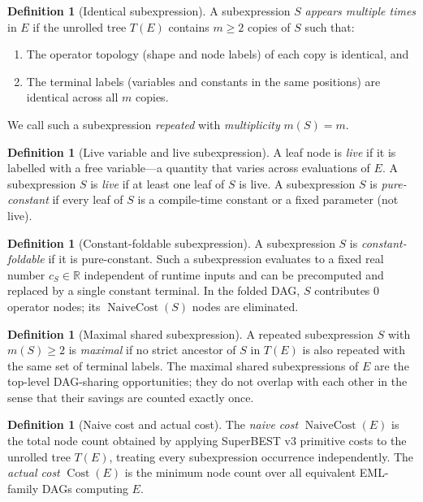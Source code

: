 \documentclass[12pt,a4paper]{article}
\theoremstyle{definition}
\newtheorem{definition}[theorem]{Definition}
\newcommand{\Cost}{\operatorname{Cost}}
\newcommand{\NC}{\operatorname{NaiveCost}}
\begin{document}
\begin{definition}[Identical subexpression]
\label{def:identical}
A subexpression $S$ \emph{appears multiple times} in $E$ if the unrolled
tree $T(E)$ contains $m \geq 2$ copies of $S$ such that:
\begin{enumerate}[nosep]
  \item The operator topology (shape and node labels) of each copy is
        identical, and
  \item The terminal labels (variables and constants in the same positions)
        are identical across all $m$ copies.
\end{enumerate}
We call such a subexpression \emph{repeated} with \emph{multiplicity}
$m(S) = m$.
\end{definition}

\begin{definition}[Live variable and live subexpression]
\label{def:live}
A leaf node is \emph{live} if it is labelled with a free variable---a
quantity that varies across evaluations of $E$.  A subexpression $S$ is
\emph{live} if at least one leaf of $S$ is live.  A subexpression $S$ is
\emph{pure-constant} if every leaf of $S$ is a compile-time constant or a
fixed parameter (not live).
\end{definition}

\begin{definition}[Constant-foldable subexpression]
\label{def:foldable}
A subexpression $S$ is \emph{constant-foldable} if it is pure-constant.
Such a subexpression evaluates to a fixed real number $c_S \in \mathbb{R}$
independent of runtime inputs and can be precomputed and replaced by a
single constant terminal.  In the folded DAG, $S$ contributes 0 operator
nodes; its $\NC(S)$ nodes are eliminated.
\end{definition}

\begin{definition}[Maximal shared subexpression]
\label{def:maximal}
A repeated subexpression $S$ with $m(S) \geq 2$ is \emph{maximal} if no
strict ancestor of $S$ in $T(E)$ is also repeated with the same set of
terminal labels.  The maximal shared subexpressions of $E$ are the
top-level DAG-sharing opportunities; they do not overlap with each other in
the sense that their savings are counted exactly once.
\end{definition}

\begin{definition}[Naive cost and actual cost]
\label{def:costs}
The \emph{naive cost} $\NC(E)$ is the total node count obtained by applying
SuperBEST v3 primitive costs to the unrolled tree $T(E)$, treating every
subexpression occurrence independently.  The \emph{actual cost}
$\Cost(E)$ is the minimum node count over all equivalent EML-family DAGs
computing $E$.
\end{definition}
\end{document}
